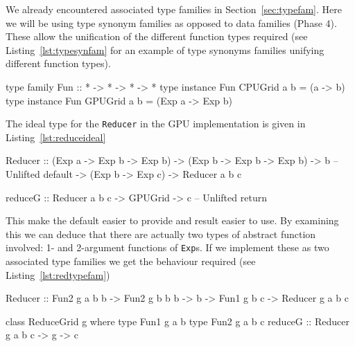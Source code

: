 \documentclass[
    12pt,
    a4paper,
    twoside,
    openright,
    ]{scrbook}
\begin{document}
We already encountered associated type families in
Section~\ref{sec:typefam}. Here we will be using type synonym families as
opposed to data families (Phase 4). These allow the unification of the different
function types required (see Listing~\ref{lst:typesynfam} for an example of type
synonyms families unifying different function types).

\begin{hflisting}[label=lst:typesynfam, caption=The type synonym family is used
  as a type function. It is used to work out the element type of a collection.
  Here the \texttt{Fun} family (representing a one-argument function) can take
  two forms depending on the compilation target.]

type family Fun :: * -> * -> * -> *
type instance Fun CPUGrid a b = (a -> b)
type instance Fun GPUGrid a b = (Exp a -> Exp b)

\end{hflisting}

The ideal type for the \texttt{Reducer} in the GPU implementation is given in
Listing~\ref{lst:reduceideal}

\begin{hlisting}[label={lst:reduceideal}, caption={The optimal type for the
    reduce primitive under Accelerate.}]
Reducer :: (Exp a -> Exp b -> Exp b)
        -> (Exp b -> Exp b -> Exp b)
        -> b -- Unlifted default
        -> (Exp b -> Exp c)
        -> Reducer a b c

reduceG :: Reducer a b c -> GPUGrid -> c -- Unlifted return
\end{hlisting}


This make the default easier to provide and result easier to use. By examining
this we can deduce that there are actually two types of abstract function
involved: 1- and 2-argument functions of \texttt{Exp}s. If we implement these as
two associated type families we get the behaviour required (see
Listing~\ref{lst:redtypefam})

\begin{hlisting}[label={lst:redtypefam}, caption={The application of type
    families to the reduce primitive.}]
Reducer :: Fun2 g a b b
        -> Fun2 g b b b
        -> b
        -> Fun1 g b c
        -> Reducer g a b c

class ReduceGrid g where
    type Fun1 g a b
    type Fun2 g a b c
    reduceG :: Reducer g a b c -> g -> c
\end{hlisting}
\end{document}

